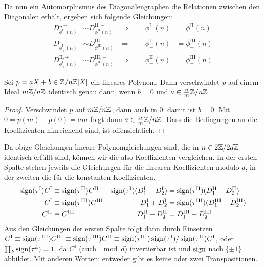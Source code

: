 Da nun ein Automorphismus des Diagonalengraphen die Relationen zwischen den Diagonalen erhält, ergeben sich folgende Gleichungen:
\begin{align*}
D_{\phi_-^\mathrm{I}(n)}^{\mathrm{I},-} &\sim D_{\phi_-^\mathrm{II}(n)}^{\mathrm{II},-}
	&\Longrightarrow\qquad \phi_-^\mathrm{I}(n) &= \phi_-^\mathrm{II}(n) \\
D_{\phi_+^\mathrm{I}(n)}^{\mathrm{I},+} &\sim D_{\phi_-^\mathrm{III}(n)}^{\mathrm{III},-}
	&\Longrightarrow\qquad \phi_+^\mathrm{I}(n) &= \phi_-^\mathrm{III}(n) \\
D_{\phi_+^\mathrm{II}(n)}^{\mathrm{II},+} &\sim D_{\phi_+^\mathrm{III}(n)}^{\mathrm{III},+}
	&\Longrightarrow\qquad \phi_+^\mathrm{II}(n) &= \phi_+^\mathrm{III}(n)
\end{align*}
\begin{fact}
Sei $p = aX+b \in \Zmod nZ[X]$ ein lineares Polynom. Dann verschwindet $p$ auf einem Ideal $m\Zmod nZ$ identisch genau dann, wenn $b=0$ und $a \in \frac n m \Zmod nZ$.
\end{fact}
\begin{proof}
Verschwindet $p$ auf $m\Zmod nZ$, dann auch in $0$: damit ist $b=0$. Mit $0 = p(m) - p(0) = am$ folgt dann $a \in \frac n m \Zmod nZ$. Dass die Bedingungen an die Koeffizienten hinreichend sind, ist offensichtlich.
\end{proof}
Da obige Gleichungen lineare Polynomgleichungen sind, die in $n \in 2\Zmod 2dZ$ identisch erfüllt sind, können wir die also Koeffizienten vergleichen. In der ersten Spalte stehen jeweils die Gleichungen für die linearen Koeffizienten modulo $d$, in der zweiten die für die konstanten Koeffizienten.
\begin{align*}
\operatorname{sign}(\tau^\mathrm{I}) C^\mathrm{I} &\equiv \operatorname{sign}(\tau^\mathrm{II}) C^\mathrm{II}
& \operatorname{sign}(\tau^\mathrm{I}) (D_1^\mathrm{I} - D_2^\mathrm{I}) &= \operatorname{sign}(\tau^\mathrm{II}) (D_1^\mathrm{II} - D_2^\mathrm{II}) \\
C^\mathrm{I} &\equiv \operatorname{sign}(\tau^\mathrm{III}) C^\mathrm{III}
& D_1^\mathrm{I} + D_2^\mathrm{I} &= \operatorname{sign}(\tau^\mathrm{III}) (D_1^\mathrm{III} - D_2^\mathrm{III}) \\
C^\mathrm{II} &\equiv C^\mathrm{III}
& D_1^\mathrm{II} + D_2^\mathrm{II} &= D_1^\mathrm{III} + D_2^\mathrm{III}
\end{align*}
Aus den Gleichungen der ersten Spalte folgt dann durch Einsetzen $C^\mathrm{I} \equiv \operatorname{sign}(\tau^\mathrm{III}) C^\mathrm{III} \equiv \operatorname{sign}(\tau^\mathrm{III}) C^\mathrm{II} \equiv \operatorname{sign}(\tau^\mathrm{III})\operatorname{sign}(\tau^\mathrm{I}) / \operatorname{sign}(\tau^\mathrm{II}) C^\mathrm{I}$, oder $\prod_k \operatorname{sign}(\tau^k) = 1$, da $C^\mathrm{I}$ (auch $\mod d$) invertierbar ist und $\operatorname{sign}$ nach $\{\pm 1\}$ abbildet. Mit anderen Worten: entweder gibt es keine oder zwei Transpositionen.

